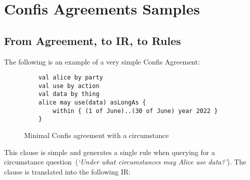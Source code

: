 \section{Confis Agreements Samples}\label{sec:confis-agreements-samples}






\subsection*{From Agreement, to IR, to Rules}

The following is an example of a very simple Confis Agreement:

\begin{figure}[h]
    \begin{verbatim}
    val alice by party
    val use by action
    val data by thing
    alice may use(data) asLongAs {
        within { (1 of June)..(30 of June) year 2022 }
    }
    \end{verbatim}
    \caption{Minimal Confis agreement with a circumstance}
    \label{fig:confis:min-circumstance}
\end{figure}

This clause is simple and generates a single rule when querying for a circumstance question~(\emph{`Under what circumstances may Alice use data?'}).
The clause is translated into the following IR:

